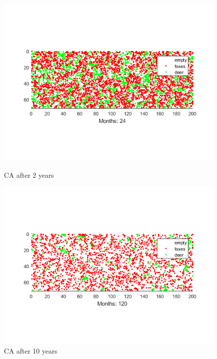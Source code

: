 \documentclass[a4paper,12pt]{article}
\begin{document}
\begin{figure}
        \begin{minipage}[t]{0.48\textwidth}
                \includegraphics[width=\textwidth]{Task2month24}
                \vspace{-20mm}
                \caption{CA after 2 years}
                \label{Task2M24}
        \end{minipage}\hfill
        \begin{minipage}[t]{0.48\textwidth}
                \includegraphics[width=\textwidth]{Task2endtime}
                \vspace{-20mm}
                \caption{CA after 10 years}
                \label{Task2end}
        \end{minipage}
        \medskip
\end{figure}
\end{document}
